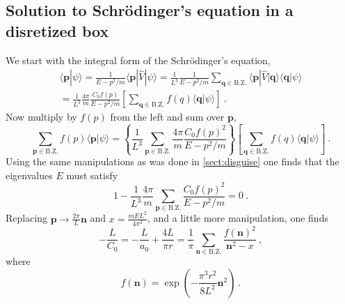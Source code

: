 \documentclass[11pt]{article}
\begin{document}
\subsection{Solution to Schr\"odinger's equation in a disretized box\label{sect:eigenvalues}}
We start with the integral form of the Schr\"odinger's equation,
\begin{multline}
\langle \bm p|\psi\rangle = \frac{1}{E-p^2/m}\langle \bm p|\hat V|\psi\rangle= 
\frac{1}{L^3}\frac{1}{E-p^2/m} \sum_{\bm q\in\mathrm{B.Z.}}\langle\bm p|\hat V|\bm q\rangle\langle\bm q|\psi\rangle\\
=\frac{1}{L^3}\frac{4\pi}{m}\frac{C_0 f(p)}{E-p^2/m} \left[\sum_{\bm q\in\mathrm{B.Z.}}f(q)\langle\bm q|\psi\rangle\right]
\ .
\end{multline}
Now multiply by $f(p)$ from the left and sum over $\bm p$,
\begin{equation}
\sum_{\bm p\in\mathrm{B.Z.}} f(p)\langle\bm p|\psi\rangle=\left\{\frac{1}{L^3}\sum_{\bm p\in\mathrm{B.Z.}}\frac{4\pi}{m}\frac{C_0 f(p)^2}{E-p^2/m} \right\} \left[\sum_{\bm q\in\mathrm{B.Z.}}f(q)\langle\bm q|\psi\rangle\right]\ .
\end{equation}
Using the same manipulations as was done in \autoref{sect:disguise} one finds that the eigenvalues $E$ must satisfy
\begin{equation}
1-\frac{1}{L^3}\frac{4\pi}{m}\sum_{\bm p\in\mathrm{B.Z.}}\frac{C_0 f(p)^2}{E-p^2/m}=0\ .
\end{equation}
Replacing $\bm p \to \frac{2\pi}{L}\bm n$ and $x=\frac{mEL^2}{4\pi^2}$, and a little more manipulation, one finds
\begin{equation}
-\frac{L}{C_0}=\boxed{-\frac{L}{a_0}+\frac{4L}{\pi  r}=\frac{1}{\pi}\sum_{\bm n\in\mathrm{B.Z.}}\frac{f\left(\bm n\right)^2}{\bm n^2-x}}\ ,
\end{equation}
where
\begin{equation}
f(\bm n)=\exp\left(-\frac{\pi ^3  r^2}{8 L^2}\bm n^2\right)\ .
\end{equation}

%
\end{document}
